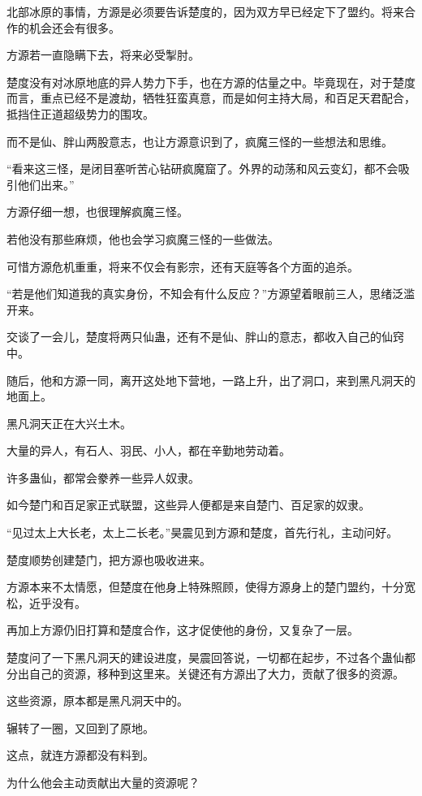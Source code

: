 \begin{this_body}
北部冰原的事情，方源是必须要告诉楚度的，因为双方早已经定下了盟约。将来合作的机会还会有很多。

方源若一直隐瞒下去，将来必受掣肘。

楚度没有对冰原地底的异人势力下手，也在方源的估量之中。毕竟现在，对于楚度而言，重点已经不是渡劫，牺牲狂蛮真意，而是如何主持大局，和百足天君配合，抵挡住正道超级势力的围攻。

而不是仙、胖山两股意志，也让方源意识到了，疯魔三怪的一些想法和思维。

“看来这三怪，是闭目塞听苦心钻研疯魔窟了。外界的动荡和风云变幻，都不会吸引他们出来。”

方源仔细一想，也很理解疯魔三怪。

若他没有那些麻烦，他也会学习疯魔三怪的一些做法。

可惜方源危机重重，将来不仅会有影宗，还有天庭等各个方面的追杀。

“若是他们知道我的真实身份，不知会有什么反应？”方源望着眼前三人，思绪泛滥开来。

交谈了一会儿，楚度将两只仙蛊，还有不是仙、胖山的意志，都收入自己的仙窍中。

随后，他和方源一同，离开这处地下营地，一路上升，出了洞口，来到黑凡洞天的地面上。

黑凡洞天正在大兴土木。

大量的异人，有石人、羽民、小人，都在辛勤地劳动着。

许多蛊仙，都常会豢养一些异人奴隶。

如今楚门和百足家正式联盟，这些异人便都是来自楚门、百足家的奴隶。

“见过太上大长老，太上二长老。”昊震见到方源和楚度，首先行礼，主动问好。

楚度顺势创建楚门，把方源也吸收进来。

方源本来不太情愿，但楚度在他身上特殊照顾，使得方源身上的楚门盟约，十分宽松，近乎没有。

再加上方源仍旧打算和楚度合作，这才促使他的身份，又复杂了一层。

楚度问了一下黑凡洞天的建设进度，昊震回答说，一切都在起步，不过各个蛊仙都分出自己的资源，移种到这里来。关键还有方源出了大力，贡献了很多的资源。

这些资源，原本都是黑凡洞天中的。

辗转了一圈，又回到了原地。

这点，就连方源都没有料到。

为什么他会主动贡献出大量的资源呢？


\end{this_body}
